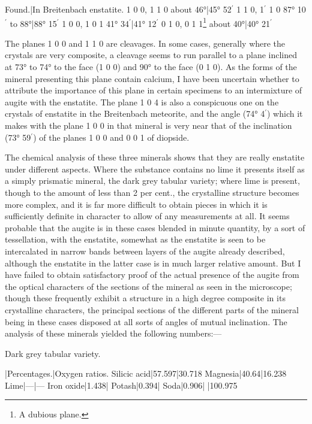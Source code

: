 \documentclass[a4paper, 12pt, oneside]{article}
\begin{document}
Found.|In Breitenbach enstatite.  
1 0 0, 1 1 0 about 46°|45° 52$^{\prime}$  
1 1 0, 1$^{\prime}$ 1 0 87° 10$^{\prime}$ to 88°|88° 15$^{\prime}$  
1 0 0, 1 0 1 41° 34$^{\prime}$|41° 12$^{\prime}$  
0 1 0, 0 1 1\footnote{A dubious plane.} about 40°|40° 21$^{\prime}$

The planes 1 0 0 and 1 1 0 are cleavages. In some cases, generally where the crystals are very composite, a cleavage seems to run parallel to a plane inclined at 73° to 74° to the face (1 0 0) and 90° to the face (0 1 0). As the forms of the mineral presenting this plane contain calcium, I have been uncertain whether to attribute the importance of this plane in certain specimens to an intermixture of augite with the enstatite. The plane 1 0 4 is also a conspicuous one on the crystals of enstatite in the Breitenbach meteorite, and the angle (74° 4$^{\prime}$) which it makes with the plane 1 0 0 in that mineral is very near that of the inclination (73° 59$^{\prime}$) of the planes 1 0 0 and 0 0 1 of diopside.

The chemical analysis of these three minerals shows that they are really enstatite under different aspects. Where the substance contains no lime it presents itself as a simply prismatic mineral, the dark grey tabular variety; where lime is present, though to the amount of less than 2 per cent., the crystalline structure becomes more complex, and it is far more difficult to obtain pieces in which it is sufficiently definite in character to allow of any measurements at all. It seems probable that the augite is in these cases blended in minute quantity, by a sort of tessellation, with the enstatite, somewhat as the enstatite is seen to be intercalated in narrow bands between layers of the augite already described, although the enstatite in the latter case is in much larger relative amount. But I have failed to obtain satisfactory proof of the actual presence of the augite from the optical characters of the sections of the mineral as seen in the microscope; though these frequently exhibit a structure in a high degree composite in its crystalline characters, the principal sections of the different parts of the mineral being in these cases disposed at all sorts of angles of mutual inclination. The analysis of these minerals yielded the following numbers:---

Dark grey tabular variety.

|Percentages.|Oxygen ratios.  
Silicic acid|57.597|30.718  
Magnesia|40.64|16.238  
Lime|---|---  
Iron oxide|1.438|  
Potash|0.394|  
Soda|0.906|  
|100.975  
\end{document}
